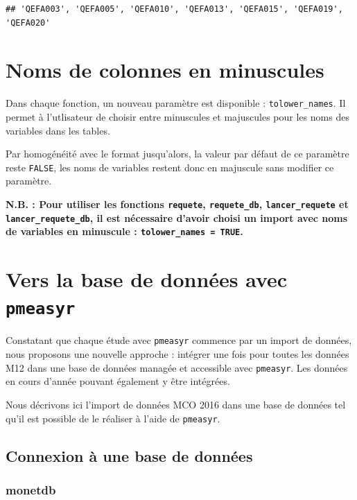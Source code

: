 \documentclass[]{book}
\begin{document}
\begin{verbatim}
## 'QEFA003', 'QEFA005', 'QEFA010', 'QEFA013', 'QEFA015', 'QEFA019', 'QEFA020'
\end{verbatim}

\chapter{Noms de colonnes en
minuscules}\label{noms-de-colonnes-en-minuscules}

Dans chaque fonction, un nouveau paramètre est disponible :
\texttt{tolower\_names}. Il permet à l'utlisateur de choisir entre
minuscules et majuscules pour les noms des variables dans les tables.

Par homogénéité avec le format jusqu'alors, la valeur par défaut de ce
paramètre reste \texttt{FALSE}, les noms de variables restent donc en
majuscule sans modifier ce paramètre.

\textbf{N.B. : Pour utiliser les fonctions \texttt{requete},
\texttt{requete\_db}, \texttt{lancer\_requete} et
\texttt{lancer\_requete\_db}, il est nécessaire d'avoir choisi un import
avec noms de variables en minuscule : \texttt{tolower\_names\ =\ TRUE}.}

\chapter{\texorpdfstring{Vers la base de données avec
\texttt{pmeasyr}}{Vers la base de données avec pmeasyr}}\label{vers-la-base-de-donnees-avec-pmeasyr}

Constatant que chaque étude avec \texttt{pmeasyr} commence par un import
de données, nous proposons une nouvelle approche : intégrer une fois
pour toutes les données M12 dans une base de données managée et
accessible avec \texttt{pmeasyr}. Les données en cours d'année pouvant
également y être intégrées.

Nous décrivons ici l'import de données MCO 2016 dans une base de données
tel qu'il est possible de le réaliser à l'aide de \texttt{pmeasyr}.

\section{Connexion à une base de
données}\label{connexion-a-une-base-de-donnees}

\subsection{monetdb}\label{monetdb}
\end{document}
